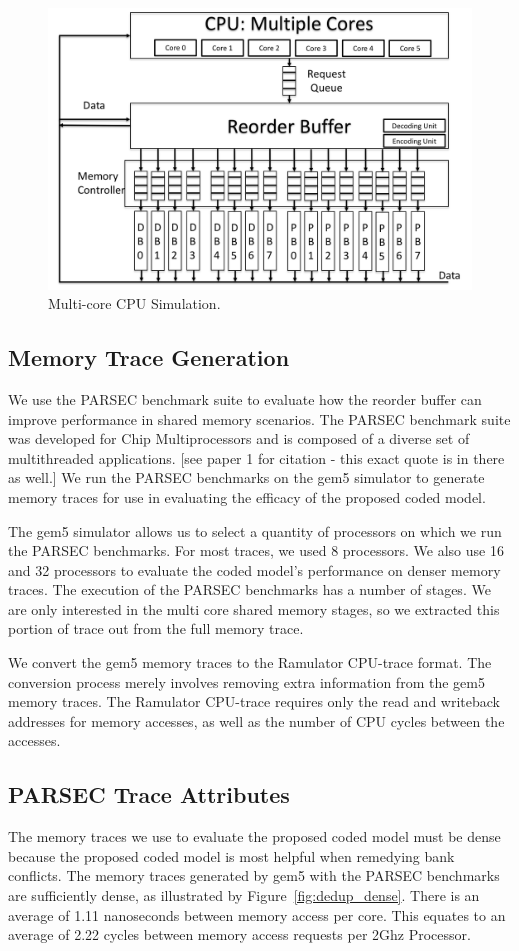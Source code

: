 \begin{figure}[h!] \centering
\includegraphics[width=0.9\linewidth]{figures/multi-core-cpu.png} 
\caption{Multi-core CPU Simulation.}
\label{fig:multi-core-cpu}
\end{figure}

\subsection{Memory Trace Generation}
We use the PARSEC benchmark suite to evaluate how the reorder buffer can improve performance in shared memory scenarios. The PARSEC benchmark suite was developed for Chip Multiprocessors and is composed of a diverse set of multithreaded applications. [see paper 1 for citation - this exact quote is in there as well.] We run the PARSEC benchmarks on the gem5 simulator to generate memory traces for use in evaluating the efficacy of the proposed coded model.

The gem5 simulator allows us to select a quantity of processors on which we run the PARSEC benchmarks. For most traces, we used 8 processors. We also use 16 and 32 processors to evaluate the coded model's performance on denser memory traces. The execution of the PARSEC benchmarks has a number of stages. We are only interested in the multi core shared memory stages, so we extracted this portion of trace out from the full memory trace.

We convert the gem5 memory traces to the Ramulator CPU-trace format. The conversion process merely involves removing extra information from the gem5 memory traces. The Ramulator CPU-trace requires only the read and writeback addresses for memory accesses, as well as the number of CPU cycles between the accesses.

\subsection{PARSEC Trace Attributes}
The memory traces we use to evaluate the proposed coded model must be dense because the proposed coded model is most helpful when remedying bank conflicts. The memory traces generated by gem5 with the PARSEC benchmarks are sufficiently dense, as illustrated by Figure~\ref{fig:dedup_dense}. There is an average of 1.11 nanoseconds between memory access per core. This equates to an average of 2.22 cycles between memory access requests per 2Ghz Processor.

